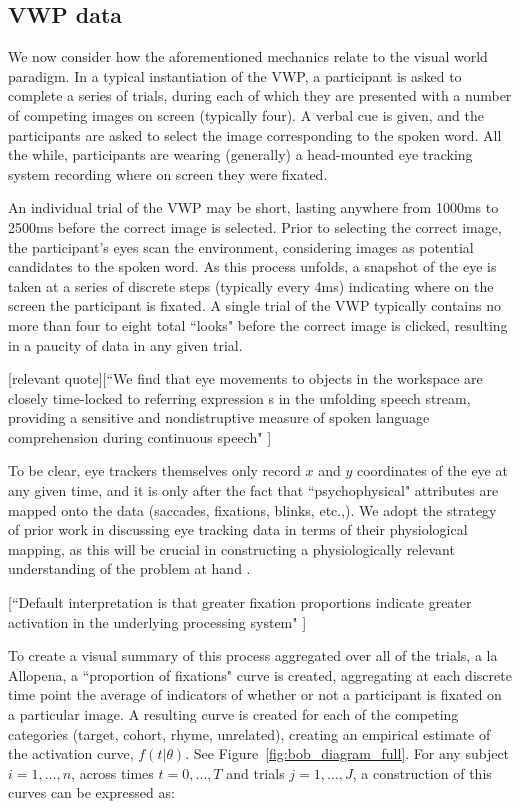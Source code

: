 \subsection{VWP data}


We now consider how the aforementioned mechanics relate to the visual world paradigm. In a typical instantiation of the VWP, a participant is asked to complete a series of trials, during each of which they are presented with a number of competing images on screen (typically four). A verbal cue is given, and the participants are asked to select the image corresponding to the spoken word. All the while, participants are wearing (generally) a head-mounted eye tracking system recording where on screen they were fixated. 

An individual trial of the VWP may be short, lasting anywhere from 1000ms to 2500ms before the correct image is selected. Prior to selecting the correct image, the participant's eyes scan the environment, considering images as potential candidates to the spoken word. As this process unfolds, a snapshot of the eye is taken at a series of discrete steps (typically every 4ms) indicating where on the screen the participant is fixated. A single trial of the VWP typically contains no more than four to eight total ``looks" before the correct image is clicked, resulting in a paucity of data in any given trial.

[relevant quote][``We find that eye movements to objects in the workspace are closely time-locked to referring expression s in the unfolding speech stream, providing a sensitive and nondistruptive measure of spoken language comprehension during continuous speech" \cite{allopenna1998tracking}]

To be clear, eye trackers themselves only record $x$ and $y$ coordinates of the eye at any given time, and it is only after the fact that ``psychophysical" attributes are mapped onto the data (saccades, fixations, blinks, etc.,). We adopt the strategy of prior work in discussing eye tracking data in terms of their physiological mapping, as this will be crucial in constructing a physiologically relevant understanding of the problem at hand \cite{mcmurray2002look}.

[``Default interpretation is that greater fixation proportions indicate greater activation in the underlying processing system" \cite{Magnuson2019}]


To create a visual summary of this process aggregated over all of the trials, a la Allopena, a ``proportion of fixations" curve is created, aggregating at each discrete time point the average of indicators of whether or not a participant is fixated on a particular image. A resulting curve is created for each of the competing categories (target, cohort, rhyme, unrelated), creating an empirical estimate of the activation curve, $f(t|\theta)$. See Figure~\ref{fig:bob_diagram_full}. For any subject $i = 1, \dots, n$, across times $t = 0, \dots, T$ and trials $j = 1, \dots, J$, a construction  of this curves can be expressed as:


